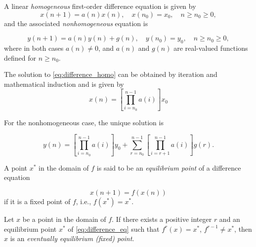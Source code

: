 \documentclass{article}
\begin{document}
\begin{defn}
    A linear \emph{homogeneous} first-order difference equation is given by
    \begin{equation}
        x(n+1) = a(n)x(n), \quad x(n_0) = x_0, \quad n \geq n_0 \geq 0, \label{eq:difference_homo}
    \end{equation}
    and the associated \emph{nonhomogeneous} equation is

    \begin{equation}
        y(n+1) = a(n)y(n) + g(n), \quad y(n_0) = y_0, \quad n \geq n_0 \geq 0, \label{eq:difference_nonhomo}
    \end{equation}
    where in both cases \(a(n) \neq 0\), and \(a(n)\) and \(g(n)\) are real-valued functions defined for \(n \geq n_0\).
\end{defn}

\begin{prop}
    The solution to \eqref{eq:difference_homo} can be obtained by iteration and mathematical induction and is given by
    \begin{equation}
        x(n) = \left[\prod_{i=n_0}^{n-1}a(i)\right] x_0
    \end{equation}

    For the nonhomogeneous case, the unique solution is

    \begin{equation}
        y(n) = \left[\prod_{i=n_0}^{n-1}a(i)\right]y_0 +  \sum_{r=n_0}^{n-1}\left[\prod_{i=r+1}^{n-1}a(i)\right]g(r).
    \end{equation}
\end{prop}

\begin{defn} 
    A point \(x^*\) in the domain of \(f\) is said to be an \emph{equilibrium point} of a difference equation 

    \begin{equation}
        x(n+1) = f(x(n))\label{eq:difference_eq}
    \end{equation}
    if it is a fixed point of \(f\), i.e., \(f(x^*) = x^*\).
\end{defn}

\begin{defn} 
    Let \(x\) be a point in the domain of \(f\). If there exists a positive integer \(r\) and an equilibrium point \(x^*\) of \eqref{eq:difference_eq} such that \(f^r(x) = x^*\), \(f^{r-1} \neq x^*\), then \(x\) is an \emph{eventually equilibrium (fixed) point}.
\end{defn}
\end{document}
